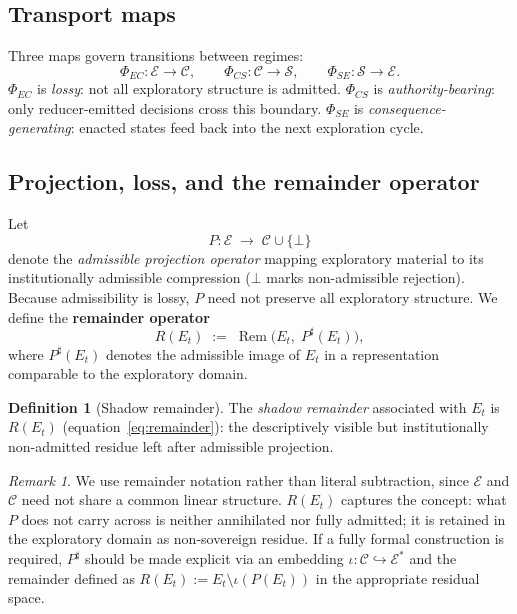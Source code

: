 \documentclass[12pt, a4paper]{article}
\theoremstyle{definition}
\newtheorem{definition}{Definition}[section]
\theoremstyle{plain}
\theoremstyle{remark}
\newtheorem{remark}{Remark}[section]
\begin{document}
\subsection{Transport maps}

Three maps govern transitions between regimes:
\[
  \Phi_{EC} : \mathcal{E} \to \mathcal{C}, \qquad
  \Phi_{CS} : \mathcal{C} \to \mathcal{S}, \qquad
  \Phi_{SE} : \mathcal{S} \to \mathcal{E}.
\]
$\Phi_{EC}$ is \emph{lossy}: not all exploratory structure is admitted.
$\Phi_{CS}$ is \emph{authority-bearing}: only reducer-emitted decisions
cross this boundary.
$\Phi_{SE}$ is \emph{consequence-generating}: enacted states feed back
into the next exploration cycle.

\subsection{Projection, loss, and the remainder operator}

Let
\[
  P : \mathcal{E} \;\longrightarrow\; \mathcal{C} \cup \{\bot\}
\]
denote the \emph{admissible projection operator} mapping exploratory
material to its institutionally admissible compression ($\bot$ marks
non-admissible rejection).
Because admissibility is lossy, $P$ need not preserve all exploratory
structure.
We define the \textbf{remainder operator}
\begin{equation}\label{eq:remainder}
  R(E_t) \;:=\; \operatorname{Rem}\!\bigl(E_t,\; P^{\sharp}(E_t)\bigr),
\end{equation}
where $P^{\sharp}(E_t)$ denotes the admissible image of $E_t$ in a
representation comparable to the exploratory domain.

\begin{definition}[Shadow remainder]\label{def:shadow-remainder}
The \emph{shadow remainder} associated with $E_t$ is $R(E_t)$
\textup{(}equation~\eqref{eq:remainder}\textup{)}: the descriptively
visible but institutionally non-admitted residue left after admissible
projection.
\end{definition}

\begin{remark}
We use remainder notation rather than literal subtraction, since
$\mathcal{E}$ and $\mathcal{C}$ need not share a common linear
structure.
$R(E_t)$ captures the concept: what $P$ does not carry across is
neither annihilated nor fully admitted; it is retained in the
exploratory domain as non-sovereign residue.
If a fully formal construction is required, $P^{\sharp}$ should be
made explicit via an embedding
$\iota : \mathcal{C} \hookrightarrow \mathcal{E}^{*}$
and the remainder defined as $R(E_t) := E_t \setminus \iota(P(E_t))$
in the appropriate residual space.
\end{remark}
\end{document}
